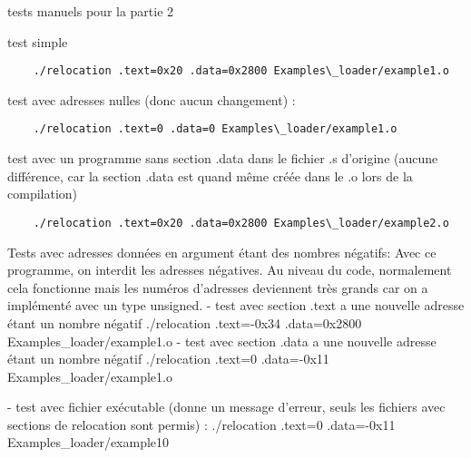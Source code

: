 \documentclass[a4paper]{article} %
\begin{document}
\noindent tests manuels pour la partie 2

\noindent test simple
\begin{lstlisting}
    ./relocation .text=0x20 .data=0x2800 Examples\_loader/example1.o
\end{lstlisting}
\bigbreak

\noindent test avec adresses nulles (donc aucun changement) :
\begin{lstlisting}
    ./relocation .text=0 .data=0 Examples\_loader/example1.o
\end{lstlisting}
\bigbreak

\noindent test avec un programme sans section .data dans le fichier .s d'origine 
(aucune différence, car la section .data est quand même créée dans le .o lors 
de la compilation)
\begin{lstlisting}
    ./relocation .text=0x20 .data=0x2800 Examples\_loader/example2.o
\end{lstlisting}
\bigbreak

Tests avec adresses données en argument étant des nombres négatifs:
Avec ce programme, on interdit les adresses négatives. Au niveau du code, 
normalement cela fonctionne mais les numéros d'adresses deviennent très grands 
car on a implémenté avec un type unsigned.
- test avec section .text a une nouvelle adresse étant un nombre négatif
./relocation .text=-0x34 .data=0x2800 Examples\_loader/example1.o
- test avec section .data a une nouvelle adresse étant un nombre négatif
./relocation .text=0 .data=-0x11 Examples\_loader/example1.o

- test avec fichier exécutable (donne un message d’erreur, seuls les fichiers 
avec sections de relocation sont permis) :
./relocation .text=0 .data=-0x11 Examples\_loader/example10
\end{document}
